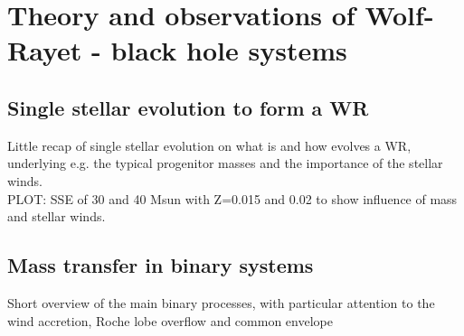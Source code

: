 \documentclass[a4paper,titlepage]{book}     	%
\begin{document}







\chapter{Theory and observations of Wolf-Rayet - black hole systems}
\section{Single stellar evolution to form a WR}
Little recap of single stellar evolution on what is and how evolves a WR, underlying e.g. the typical progenitor masses and the importance of the stellar winds.\\


PLOT: SSE of 30 and 40 Msun with Z=0.015 and 0.02 to show influence of mass and stellar winds.

\section{Mass transfer in binary systems}
Short overview of the main binary processes, with particular attention to the wind accretion, Roche lobe overflow and common envelope
\end{document}
